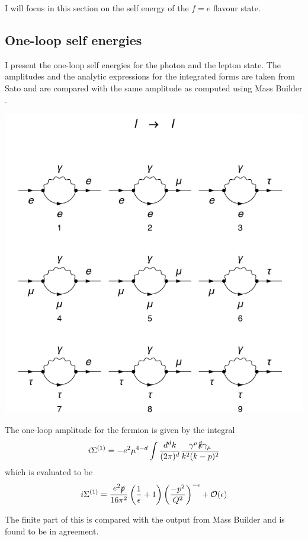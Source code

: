 \documentclass[11pt]{article}
\newcommand{\mb}{\textsf{Mass Builder} }
\begin{document}
I will focus in this section on the self energy of the $f=e$ flavour state.

\subsection{One-loop self energies}
I present the one-loop self energies for the photon and the lepton state.  The amplitudes and the analytic expressions for the integrated forms are taken from Sato \cite{Sato2013} and are compared with the same amplitude as computed using \mb.\\

\noindent\begin{minipage}{0.3\textwidth}
\begin{center}
\includegraphics{QED_f_1loop.pdf}
\end{center}
\end{minipage}
\noindent\begin{minipage}{0.7\textwidth}
The one-loop amplitude for the fermion is given by the integral \cite{Sato2013}
\begin{align}
i\Sigma^{(1)} = -e^2\mu^{4-d}\int\frac{d^dk}{(2\pi)^d} \frac{\gamma^{\mu}\slashed{k}\gamma_{\mu}}{k^2(k-p)^2}
\end{align}
which is evaluated to be \cite{Sato2013}
\begin{align}
i\Sigma^{(1)} = \frac{e^2\slashed{p}}{16\pi^2}\left(\frac{1}{\epsilon}+1\right)\left(\frac{-p^2}{Q^2}\right)^{-\epsilon}+\mathcal{O}(\epsilon)
\end{align}
\end{minipage}
The finite part of this is compared with the output from \mb and is found to be in agreement.\\
\end{document}

